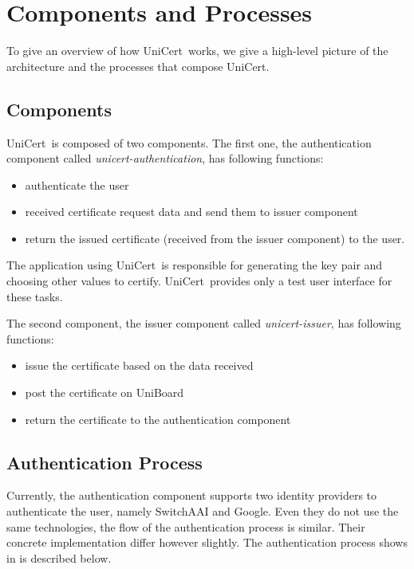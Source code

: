 \documentclass[oneside]{scrreprt}
\newcommand{\uniboard}{\mbox{UniBoard}}
\newcommand{\unicert}{\mbox{UniCert}}
\begin{document}
\chapter{Components and Processes} \label{chap:process}

To give an overview of how \unicert\ works, we give a high-level picture of the architecture and the processes that compose \unicert.

\section{Components}

\unicert\ is composed of two components. The first one, the authentication component called \textit{unicert-authentication}, has following functions:
\begin{itemize}
\item authenticate the user
\item received certificate request data and send them to issuer component
\item return the issued certificate (received from the issuer component) to the user.
\end{itemize}
The application using \unicert\ is responsible for generating the key pair and choosing other values to certify. \unicert\ provides only a test user interface for these tasks.

The second component, the issuer component called \textit{unicert-issuer}, has following functions:
\begin{itemize}
\item issue the certificate based on the data received
\item post the certificate on \uniboard
\item return the certificate to the authentication component
\end{itemize}

\section{Authentication Process} \label{sec:auth_process}


Currently, the authentication component supports two identity providers to authenticate the user, namely SwitchAAI and Google. Even they do not use the same technologies, the flow of the authentication process is similar. Their concrete implementation differ however slightly. The authentication process shows in  is described below.
\end{document}
